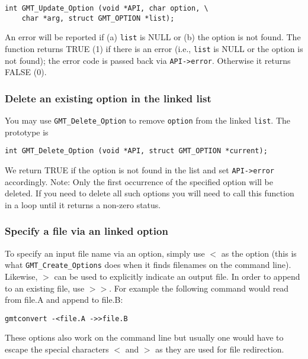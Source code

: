 \documentclass[11pt]{report}
\begin{document}
\begin{verbatim}
int GMT_Update_Option (void *API, char option, \
    char *arg, struct GMT_OPTION *list);
\end{verbatim}
An error will be reported if (a) \texttt{list} is NULL or (b) the option is not found.
The function returns TRUE (1) if there is an error (i.e., \texttt{list} is NULL or the
option is not found); the error code is passed back via \texttt{API->error}.
Otherwise it returns FALSE (0).

\subsubsection{Delete an existing option in the linked list}

You may use \texttt{GMT\_Delete\_Option} to remove \texttt{option} from
the linked \texttt{list}.  The prototype is

\begin{verbatim}
int GMT_Delete_Option (void *API, struct GMT_OPTION *current);
\end{verbatim}
We return TRUE if the option is not found in the list and set \texttt{API->error} accordingly.
Note: Only the first occurrence of the specified option will be deleted.  If you need to delete all such
options you will need to call this function in a loop until it returns a non-zero
status.

\subsubsection{Specify a file via an linked option}

To specify an input file name via an option, simply use $<$ as the option (this is what
\texttt{GMT\_Create\_Options} does when it finds filenames on the command line).
Likewise, $>$ can be used to explicitly indicate an output file.  In order to append to
an existing file, use $>>$.  For example the following command would read from file.A
and append to file.B:

\begin{verbatim}
gmtconvert -<file.A ->>file.B
\end{verbatim}

These options also work on the command line but usually one would have to escape the
special characters $<$ and $>$ as they are used for file redirection.
\end{document}
